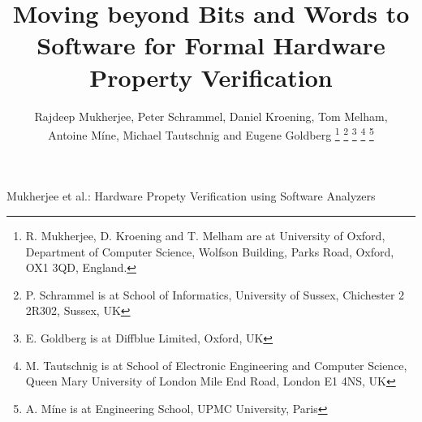 \documentclass[journal]{IEEEtran}
\theoremstyle{definition}
\begin{document}
\title{Moving beyond Bits and Words to Software for Formal Hardware Property Verification}
\author{Rajdeep Mukherjee, 
        Peter Schrammel,
        Daniel Kroening, 
        Tom Melham, \\
        Antoine M{\'i}ne,
        Michael Tautschnig and
        Eugene Goldberg
        \thanks{R. Mukherjee, D. Kroening and T. Melham are at 
                University of Oxford, Department of Computer Science,
                Wolfson Building, Parks Road,
                Oxford, OX1 3QD, England.}
        \thanks{P. Schrammel is at School of Informatics, University of Sussex, 
                Chichester 2 2R302, Sussex, UK}
        \thanks{E. Goldberg is at Diffblue Limited, Oxford, UK}
        \thanks{M. Tautschnig is at 
                School of Electronic Engineering and Computer Science,
                Queen Mary University of London
                Mile End Road, London E1 4NS, UK}
        \thanks{A. M{\'i}ne is at Engineering School, UPMC University, Paris}}
%
         {Mukherjee et al.: Hardware Propety Verification using Software Analyzers}
\maketitle
\end{document}
